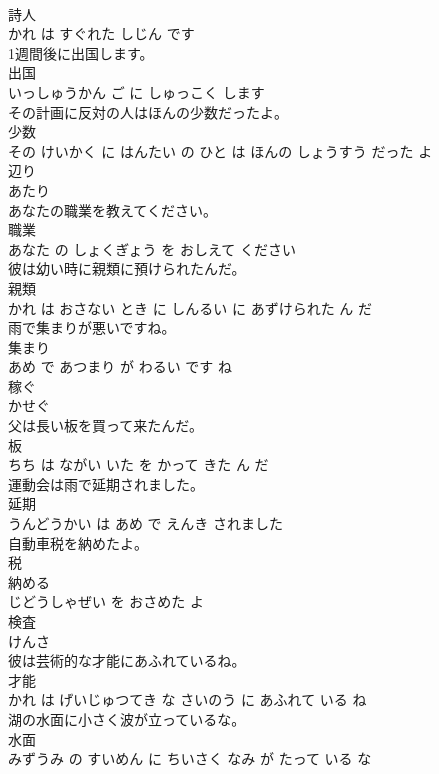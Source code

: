 \documentclass[8pt]{extreport}
\begin{document}
\begin{CJK}{UTF8}{min}
\\	詩人 
\\	かれ は すぐれた しじん です			
\\	1週間後に出国します。	
\\	出国 
\\	いっしゅうかん ご に しゅっこく します			
\\	その計画に反対の人はほんの少数だったよ。	
\\	少数 
\\	その けいかく に はんたい の ひと は ほんの しょうすう だった よ			
\\	辺り	
\\	あたり			
\\	あなたの職業を教えてください。	
\\	職業 
\\	あなた の しょくぎょう を おしえて ください			
\\	彼は幼い時に親類に預けられたんだ。	
\\	親類 
\\	かれ は おさない とき に しんるい に あずけられた ん だ			
\\	雨で集まりが悪いですね。	
\\	集まり 
\\	あめ で あつまり が わるい です ね			
\\	稼ぐ	
\\	かせぐ			
\\	父は長い板を買って来たんだ。	
\\	板 
\\	ちち は ながい いた を かって きた ん だ			
\\	運動会は雨で延期されました。	
\\	延期 
\\	うんどうかい は あめ で えんき されました			
\\	自動車税を納めたよ。	
\\	税 
\\	納める 
\\	じどうしゃぜい を おさめた よ			
\\	検査	
\\	けんさ			
\\	彼は芸術的な才能にあふれているね。	
\\	才能 
\\	かれ は げいじゅつてき な さいのう に あふれて いる ね			
\\	湖の水面に小さく波が立っているな。	
\\	水面 
\\	みずうみ の すいめん に ちいさく なみ が たって いる な			

\end{CJK}
\end{document}
